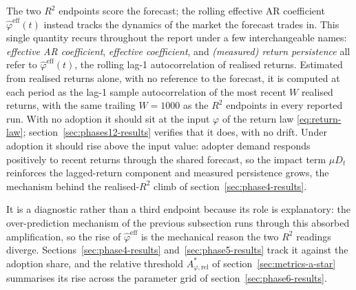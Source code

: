 \documentclass[12pt]{article}
\begin{document}
The two $R^{2}$ endpoints score the forecast; the rolling effective AR coefficient $\hat{\varphi}^{\mathrm{eff}}(t)$ instead tracks the dynamics of the market the forecast trades in. This single quantity recurs throughout the report under a few interchangeable names: \emph{effective AR coefficient}, \emph{effective coefficient}, and \emph{(measured) return persistence} all refer to $\hat{\varphi}^{\mathrm{eff}}(t)$, the rolling lag-1 autocorrelation of realised returns. Estimated from realised returns alone, with no reference to the forecast, it is computed at each period as the lag-1 sample autocorrelation of the most recent $W$ realised returns, with the same trailing $W = 1000$ as the $R^{2}$ endpoints in every reported run. %
With no adoption it should sit at the input $\varphi$ of the return law \eqref{eq:return-law}; section~\ref{sec:phases12-results} verifies that it does, with no drift. %
Under adoption it should rise above the input value: adopter demand responds positively to recent returns through the shared forecast, so the impact term $\mu D_t$ reinforces the lagged-return component and measured persistence grows, the mechanism behind the realised-$R^{2}$ climb of section~\ref{sec:phase4-results}. %

It is a diagnostic rather than a third endpoint because its role is explanatory: the over-prediction mechanism of the previous subsection runs through this absorbed amplification, so the rise of $\hat{\varphi}^{\mathrm{eff}}$ is the mechanical reason the two $R^{2}$ readings diverge. %
Sections~\ref{sec:phase4-results} and~\ref{sec:phase5-results} track it against the adoption share, and the relative threshold $A^{*}_{\varphi,\mathrm{rel}}$ of section~\ref{sec:metrics-a-star} summarises its rise across the parameter grid of section~\ref{sec:phase6-results}. %
\end{document}
